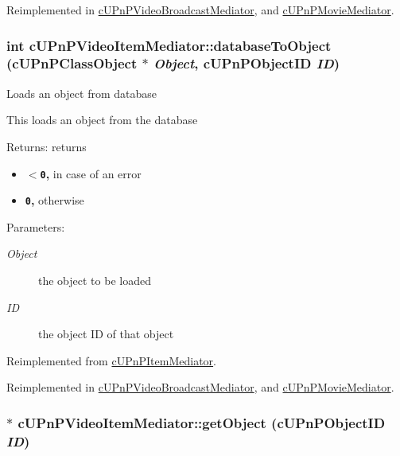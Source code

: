 Reimplemented in \hyperlink{classcUPnPVideoBroadcastMediator_14fefa90807d40d91a80712729af2beb}{cUPnPVideoBroadcastMediator}, and \hyperlink{classcUPnPMovieMediator_29d40a311b7283cc4fba36860ac8c935}{cUPnPMovieMediator}.\hypertarget{classcUPnPVideoItemMediator_3f7ec1937b2b95e3ec5462470971d350}{
\subsubsection[{databaseToObject}]{\setlength{\rightskip}{0pt plus 5cm}int cUPnPVideoItemMediator::databaseToObject ({\bf cUPnPClassObject} $\ast$ {\em Object}, \/  {\bf cUPnPObjectID} {\em ID})}}
\label{classcUPnPVideoItemMediator_3f7ec1937b2b95e3ec5462470971d350}


Loads an object from database

This loads an object from the database

\begin{Desc}
\item[Returns:]returns\begin{itemize}
\item {\bf {\tt $<$0},} in case of an error\item {\bf {\tt 0},} otherwise \end{itemize}
\end{Desc}
\begin{Desc}
\item[Parameters:]
\begin{description}
\item[{\em Object}]the object to be loaded \item[{\em ID}]the object ID of that object \end{description}
\end{Desc}
 

Reimplemented from \hyperlink{classcUPnPItemMediator_1f3645ebe0a33a81d0b3f22060dc4761}{cUPnPItemMediator}.

Reimplemented in \hyperlink{classcUPnPVideoBroadcastMediator_33237e5d850c107d37be37c1646b17d7}{cUPnPVideoBroadcastMediator}, and \hyperlink{classcUPnPMovieMediator_542135e9c1051b57a8f6f5ecc0c1ede3}{cUPnPMovieMediator}.\hypertarget{classcUPnPVideoItemMediator_dd8927340a69d247965ef9250adefb21}{
\subsubsection[{getObject}]{ $\ast$ cUPnPVideoItemMediator::getObject ({\bf cUPnPObjectID} {\em ID})}}
\label{classcUPnPVideoItemMediator_dd8927340a69d247965ef9250adefb21}


